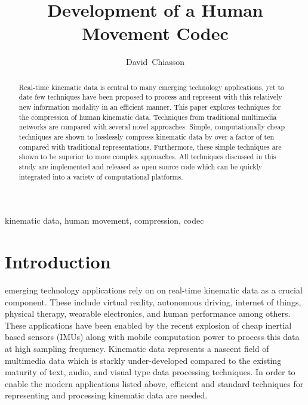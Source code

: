 \documentclass[journal]{IEEEtran}
\begin{document}
\title{Development of a Human Movement Codec}

\author{David~Chiasson}

\maketitle

\begin{abstract}
Real-time kinematic data is central to many emerging technology applications, yet to date few techniques have been proposed to process and represent with this relatively new information modality in an efficient manner. This paper explores techniques for the compression of human kinematic data. Techniques from traditional multimedia networks are compared with several novel approaches. Simple, computationally cheap techniques are shown to losslessly compress kinematic data by over a factor of ten compared with traditional representations. Furthermore, these simple techniques are shown to be superior to more complex approaches.
All techniques discussed in this study are implemented and released as open source code which can be quickly integrated into a variety of computational platforms. 
\end{abstract}

\begin{IEEEkeywords}
kinematic data, human movement, compression, codec
\end{IEEEkeywords}



\section{Introduction}

 emerging technology applications rely on on real-time kinematic data as a crucial component. These include virtual reality, autonomous driving, internet of things, physical therapy, wearable electronics, and human performance among others. These applications have been enabled by the recent explosion of cheap inertial based sensors (IMUs) along with mobile computation power to process this data at high sampling frequency. Kinematic data represents a nascent field of multimedia data which is starkly under-developed compared to the existing maturity of text, audio, and visual type data processing techniques. In order to enable the modern applications listed above, efficient and standard techniques for representing and processing kinematic data are needed.
\end{document}

